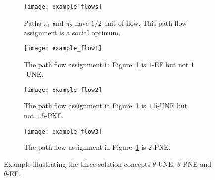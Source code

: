 %
%
\begin{figure}
	\centering
	\begin{subfigure}[b]{0.45\linewidth}
		\centering
		\texttt{[image: example\_flows]}
		\caption{Paths $\pi_1$ and $\pi_2$ have $1/2$ unit of flow.  This path flow assignment is a social optimum.}
		\label{fig:ex_flows1}
	\end{subfigure}\hspace{0.05\linewidth}
	\begin{subfigure}[b]{0.45\linewidth}
		\centering
		\texttt{[image: example\_flow1]}
		\caption{The path flow assignment in Figure~\ref{fig:ex_flows1} is $1$-EF but not $1$-UNE.}
		\label{fig:ex_flows01}
	\end{subfigure}
	
	\begin{subfigure}[b]{0.45\linewidth}
		\centering
		\texttt{[image: example\_flow2]}
		\caption{The path flow assignment in Figure~\ref{fig:ex_flows1} is $1.5$-UNE but not $1.5$-PNE.}
		\label{fig:ex_flows2}
	\end{subfigure}\hspace{0.05\linewidth}
	\begin{subfigure}[b]{0.45\linewidth}
		\centering
		\texttt{[image: example\_flow3]}
		\caption{The path flow assignment in Figure~\ref{fig:ex_flows1} is $2$-PNE.}
		\label{fig:ex_flows3}
	\end{subfigure}
	\caption{Example illustrating the three solution concepts $\theta$-UNE, $\theta$-PNE and $\theta$-EF. }
	\label{fig:ex_flows}
\end{figure}
% 


